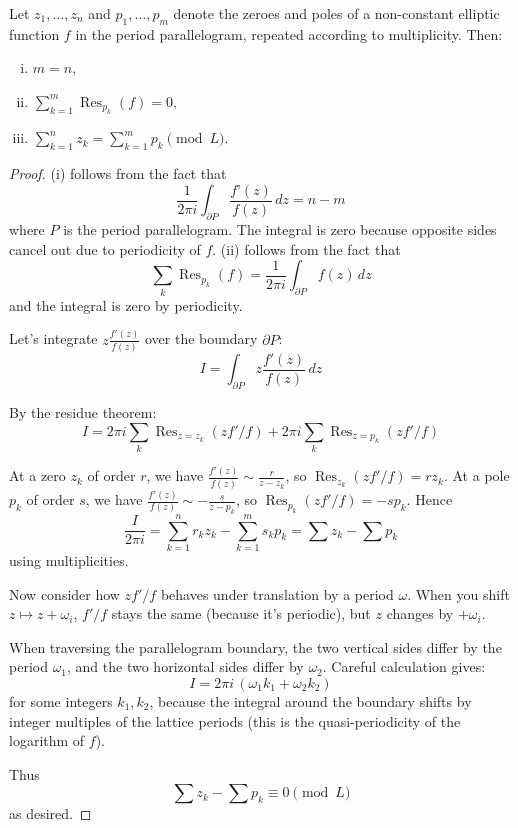 \documentclass[12pt]{article}
\begin{document}
\begin{theorem}
Let $z_1, \dots, z_n$ and $p_1, \dots, p_m$ denote the zeroes and poles of a non-constant elliptic function $f$ in the period parallelogram, repeated according to multiplicity. Then:
\begin{enumerate}[(i)]
    \item $m = n$,
    \item $\displaystyle \sum_{k=1}^m \operatorname{Res}_{p_k}(f) = 0,$
    \item $\displaystyle \sum_{k=1}^n z_k = \sum_{k=1}^m p_k \pmod{L}.$
\end{enumerate}
\end{theorem}

\begin{proof}
    (i) follows from the fact that
    \[\frac{1}{2\pi i}\int_{\partial P} \frac{f’(z)}{f(z)}\,dz = n - m\] where $P$ is the period parallelogram. The integral is zero because opposite sides cancel out due to periodicity of $f$.
    (ii) follows from the fact that
    \[\sum_k \operatorname{Res}_{p_k}(f) = \frac{1}{2\pi i} \int_{\partial P} f(z)\,dz\] and the integral is zero by periodicity.

Let's integrate $z\frac{f'(z)}{f(z)}$ over the boundary $\partial P$:
\[
I = \int_{\partial P} z\frac{f'(z)}{f(z)}\,dz
\]

By the residue theorem:
\[
I = 2\pi i\sum_{k} \operatorname{Res}_{z=z_k}(z f'/f) + 2\pi i\sum_{k} \operatorname{Res}_{z=p_k}(z f'/f)
\]

At a zero $z_k$ of order $r$, we have $\frac{f'(z)}{f(z)} \sim \frac{r}{z-z_k}$, so $\operatorname{Res}_{z_k}(z f'/f) = r z_k$. At a pole $p_k$ of order $s$, we have $\frac{f'(z)}{f(z)} \sim -\frac{s}{z-p_k}$, so $\operatorname{Res}_{p_k}(z f'/f) = -s p_k$. Hence
\[
\frac{I}{2\pi i} = \sum_{k=1}^n r_k z_k - \sum_{k=1}^m s_k p_k = \sum z_k - \sum p_k
\]
using multiplicities.

Now consider how $z f'/f$ behaves under translation by a period $\omega$. When you shift $z \mapsto z+\omega_i$, $f'/f$ stays the same (because it's periodic), but $z$ changes by $+\omega_i$.

When traversing the parallelogram boundary, the two vertical sides differ by the period $\omega_1$, and the two horizontal sides differ by $\omega_2$. Careful calculation gives:
\[
I = 2\pi i\,(\omega_1 k_1 + \omega_2 k_2)
\]
for some integers $k_1,k_2$, because the integral around the boundary shifts by integer multiples of the lattice periods (this is the quasi-periodicity of the logarithm of $f$).

Thus
\[
\sum z_k - \sum p_k \equiv 0 \pmod{L}
\]
as desired.
\end{proof}
\end{document}

